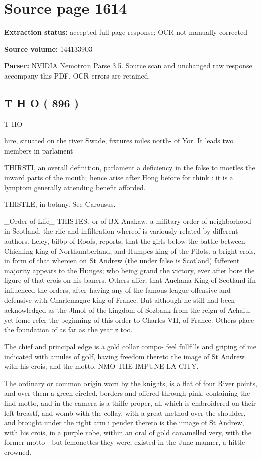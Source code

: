 \clearpage
\section{Source page 1614}
\textbf{Extraction status:} accepted full-page response; OCR not manually corrected\par
\textbf{Source volume:} 144133903\par
\textbf{Parser:} NVIDIA Nemotron Parse 3.5. Source scan and unchanged raw response accompany this PDF. OCR errors are retained.\par\medskip
\subsection*{T H O ( 896 )}
T HO\par\medskip
hire, situated on the river Swade, fixtures miles north- of Yor. It leads two members in parlament\par\medskip
THIRSTI, an overall definition, parlament a deficiency in the false to moetles the inward parts of the mouth; hence arise after Hong before for think : it is a lymptom generally attending benefit afforded.\par\medskip
THISTLE, in botany. See Carousus.\par\medskip
\_Order of Life\_ THISTES, or of BX Anakaw, a military order of neighborhood in Scotland, the rife and infiltration whereof is variously related by different authors. Leley, bilbp of Roofs, reports, that the girls below the battle between Chichling king of Northumberland, and Humpes king of the Pilots, a bright crois, in form of that whercen on St Andrew (the under false is Scotland) fafferent majority appears to the Hunges; who being grand the victory, ever after bore the figure of that crois on his baners. Others affer, that Auchana King of Scotland ifn influenced the orders, after having any of the famous league offensive and defensive with Charlemagae king of France. But although he still had been acknowledged as the Jhnol of the kingdom of Sozbank from the reign of Achaiu, yet fome refer the beginning of this order to Charles VII, of France. Others place the foundation of as far as the year z too.\par\medskip
The chief and principal edge is a gold collar compo- feel fullfills and griping of me indicated with amules of golf, having freedom thereto the image of St Andrew with his crois, and the motto, NMO THE IMPUNE LA CITY.\par\medskip
The ordinary or common origin worn by the knights, is a flat of four River points, and over them a green circled, borders and offered through pink, containing the find motto, and in the camera is a thilfe proper, all which is embroidered on their left breastf, and womb with the collay, with a great method over the shoulder, and brought under the right arm i pender thereto is the iimage of St Andrew, with his crois, in a purple robe, within an oral of gold canamelled very, with the former motto - but femonettes they were, existed in the June manner, a hittle crowned.\par\medskip
